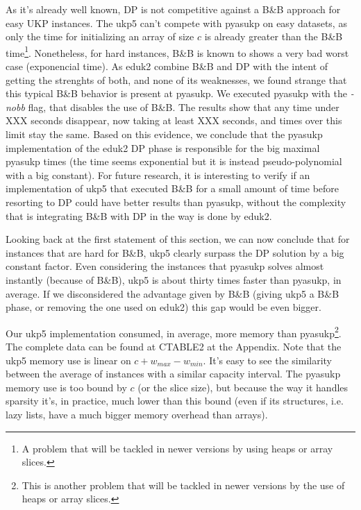 \documentclass[runningheads,a4paper]{llncs}
\begin{document}
As it's already well known, DP is not competitive against a B\&B approach for easy UKP instances. The ukp5 can't compete with pyasukp on easy datasets, as only the time for initializing an array of size \(c\) is already greater than the B\&B time\footnote{A problem that will be tackled in newer versions by using heaps or array slices.}. Nonetheless, for hard instances, B\&B is known to shows a very bad worst case (exponencial time). As eduk2 combine B\&B and DP with the intent of getting the strenghts of both, and none of its weaknesses, we found strange that this typical B\&B behavior is present at pyasukp. We executed pyasukp with the \emph{-nobb} flag, that disables the use of B\&B. The results show that any time under XXX seconds disappear, now taking at least XXX seconds, and times over this limit stay the same. Based on this evidence, we conclude that the pyasukp implementation of the eduk2 DP phase is responsible for the big maximal pyasukp times (the time seems exponential but it is instead pseudo-polynomial with a big constant). For future research, it is interesting to verify if an implementation of ukp5 that executed B\&B for a small amount of time before resorting to DP could have better results than pyasukp, without the complexity that is integrating B\&B with DP in the way is done by eduk2.

Looking back at the first statement of this section, we can now conclude that for instances that are hard for B\&B, ukp5 clearly surpass the DP solution by a big constant factor. Even considering the instances that pyasukp solves almost instantly (because of B\&B), ukp5 is about thirty times faster than pyasukp, in average. If we disconsidered the advantage given by B\&B (giving ukp5 a B\&B phase, or removing the one used on eduk2) this gap would be even bigger.

Our ukp5 implementation consumed, in average, more memory than pyasukp\footnote{This is another problem that will be tackled in newer versions by the use of heaps or array slices.}. The complete data can be found at CTABLE2 at the Appendix. Note that the ukp5 memory use is linear on \(c + w_{max} - w_{min}\). It's easy to see the similarity between the average of instances with a similar capacity interval. The pyasukp memory use is too bound by \(c\) (or the slice size), but because the way it handles sparsity it's, in practice, much lower than this bound (even if its structures, i.e. lazy lists, have a much bigger memory overhead than arrays).
\end{document}
